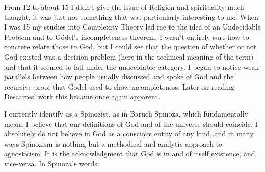\documentclass[12pt,letterpaper]{article}
\begin{document}
\begin{spacing}{2}
        From 12 to about 15 I didn't give the issue of Religion and spirituality
        much thought, it was just not something that was particularly
        interesting to me. When I was 15 my studies into Complexity Theory led
        me to the idea of an Undecidable Problem and to G\"odel's incompleteness
        theorem. I wasn't entirely sure how to concrete relate those to God, but
        I could see that the question of whether or not God existed was a
        decision problem (here in the technical meaning of the term) and that it
        seemed to fall under the undecidable category. I began to notice weak
        parallels between how people usually discussed and spoke of God and the
        recursive proof that G\"odel used to show incompleteness. Later on
        reading Descartes' work this became once again apparent.

        I currently identify as a Spinozist, as in Baruch Spinoza, which
        fundamentally means I believe that our definitions of God and of the
        universe should coincide. I absolutely do not believe in God as a
        conscious entity of any kind, and in many ways Spinozism is nothing but
        a methodical and analytic approach to agnosticism. It is the
        acknowledgment that God is in and of itself existence, and vice-versa.
        In Spinoza's words:


\end{spacing}
\end{document}
